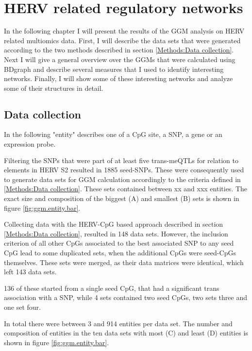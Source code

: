 \documentclass[a4paper,12pt,twoside,openright]{report}
\begin{document}
\section{HERV related regulatory networks}
\label{Results:HERV related regulatory networks}
In the following chapter I will present the results of the GGM analysis on HERV related multiomics data. First, I will describe the data sets that were generated according to the two methods described in section \ref{Methods:Data collection}. Next I will give a general overview over the GGMs that were calculated using BDgraph and describe several measures that I used to identify interesting networks. Finally, I will show some of these interesting networks and analyze some of their structures in detail.

\subsection{Data collection}
\label{Results:Data collection}
In the following "entity" describes one of a CpG site, a SNP, a gene or an expression probe.

Filtering the SNPs that were part of at least five trans-meQTLs for relation to elements in HERV S2 resulted in 1885 seed-SNPs. These were consequently used to generate data sets for GGM calculation accordingly to the criteria defined in \ref{Methods:Data collection}. These sets contained between xx and xxx entities. The exact size and composition of the biggest (A) and smallest (B) sets is shown in figure \ref{fig:ggm.entity.bar}.


Collecting data with the HERV-CpG based approach described in section \ref{Methods:Data collection}, resulted in 148 data sets. However, the inclusion criterion of all other CpGs associated to the best associated SNP to any seed CpG lead to some duplicated sets, when the additional CpGs were seed-CpGs themselves. These sets were merged, as their data matrices were identical, which left 143 data sets. 

136 of these started from a single seed CpG, that had a significant trans association with a SNP, while 4 sets contained two seed CpGs, two sets three and one set four. 

In total there were between 3 and 914 entities per data set. The number and composition of entities in the ten data sets with most (C) and least (D) entities is shown in figure \ref{fig:ggm.entity.bar}.
\end{document}
